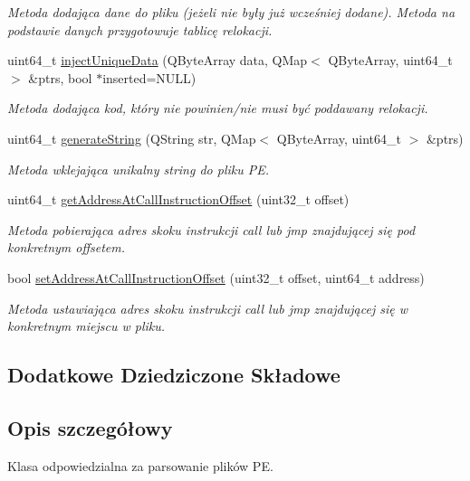 \begin{DoxyCompactItemize}
\begin{DoxyCompactList}\small\item\em Metoda dodająca dane do pliku (jeżeli nie były już wcześniej dodane). Metoda na podstawie danych przygotowuje tablicę relokacji. \end{DoxyCompactList}\item 
uint64\-\_\-t \hyperlink{class_p_e_file_a6bea21405c1aab9b4e3d43d980a5aac5}{inject\-Unique\-Data} (Q\-Byte\-Array data, Q\-Map$<$ Q\-Byte\-Array, uint64\-\_\-t $>$ \&ptrs, bool $\ast$inserted=N\-U\-L\-L)
\begin{DoxyCompactList}\small\item\em Metoda dodająca kod, który nie powinien/nie musi być poddawany relokacji. \end{DoxyCompactList}\item 
uint64\-\_\-t \hyperlink{class_p_e_file_a2dca67d21245ba63171ee34456456f96}{generate\-String} (Q\-String str, Q\-Map$<$ Q\-Byte\-Array, uint64\-\_\-t $>$ \&ptrs)
\begin{DoxyCompactList}\small\item\em Metoda wklejająca unikalny string do pliku P\-E. \end{DoxyCompactList}\item 
uint64\-\_\-t \hyperlink{class_p_e_file_a1cf0f58cf7e061011a1dd95b16076e07}{get\-Address\-At\-Call\-Instruction\-Offset} (uint32\-\_\-t offset)
\begin{DoxyCompactList}\small\item\em Metoda pobierająca adres skoku instrukcji call lub jmp znajdującej się pod konkretnym offsetem. \end{DoxyCompactList}\item 
bool \hyperlink{class_p_e_file_a6c06d44bec906ab659326541e6244850}{set\-Address\-At\-Call\-Instruction\-Offset} (uint32\-\_\-t offset, uint64\-\_\-t address)
\begin{DoxyCompactList}\small\item\em Metoda ustawiająca adres skoku instrukcji call lub jmp znajdującej się w konkretnym miejscu w pliku. \end{DoxyCompactList}\end{DoxyCompactItemize}
\subsection*{Dodatkowe Dziedziczone Składowe}


\subsection{Opis szczegółowy}
Klasa odpowiedzialna za parsowanie plików P\-E. 

